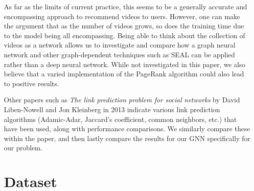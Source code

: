 \documentclass[10pt,twocolumn,letterpaper]{article}
\begin{document}
As far as the limits of current practice, this seems to be a generally accurate and encompassing approach to recommend videos to users. However, one can make the argument that as the number of videos grows, so does the training time due to the model being all encompassing. Being able to think about the collection of videos as a network allows us to investigate and compare how a graph neural network and other graph-dependent techniques such as SEAL can be applied rather than a deep neural network. While not investigated in this paper, we also believe that a varied implementation of the PageRank algorithm could also lead to positive results.

Other papers such as \textit{The link prediction problem for social networks} by David Liben-Nowell and Jon Kleinberg in 2013 indicate various link prediction algorithms (Adamic-Adar, Jaccard's coefficient, common neighbors, etc.) that have been used, along with performance comparisons. \cite{link-prediction-social-network} We similarly compare these within the paper, and then lastly compare the results for our GNN specifically for our problem.

\section{Dataset}
\end{document}
